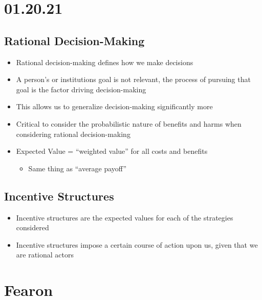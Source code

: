 \documentclass[11pt]{article}
\begin{document}
\section{01.20.21}
\label{sec:org333dd6e}
\subsection{Rational Decision-Making}
\label{sec:org9ff421c}
\begin{itemize}
\item Rational decision-making defines how we make decisions
\item A person's or institutions goal is not relevant, the process of pursuing that goal is the factor driving decision-making
\item This allows us to generalize decision-making significantly more
\item Critical to consider the probabilistic nature of benefits and harms when considering rational decision-making
\item Expected Value = ``weighted value'' for all costs and benefits
\begin{itemize}
\item Same thing as ``average payoff''
\end{itemize}
\end{itemize}
\subsection{Incentive Structures}
\label{sec:orgdeafde7}
\begin{itemize}
\item Incentive structures are the expected values for each of the strategies considered
\item Incentive structures impose a certain course of action upon us, given that we are rational actors
\end{itemize}
\section{Fearon}
\label{sec:org2a45ca0}
\end{document}
